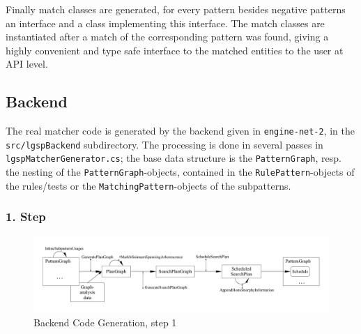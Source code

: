 Finally match classes are generated, for every pattern besides negative patterns an interface and a class implementing this interface.
The match classes are instantiated after a match of the corresponding pattern was found, giving a highly convenient and type safe interface to the matched entities to the user at API level.


\subsection{Backend}

The real matcher code is generated by the backend given in \texttt{engine-net-2}, in the \texttt{src/lgspBackend} subdirectory.
The processing is done in several passes in \texttt{lgsp\-Matcher\-Generator.cs}; the base data structure is the \texttt{PatternGraph}, resp. the nesting of the \texttt{PatternGraph}-objects, contained in the \texttt{RulePattern}-objects of the rules/tests or the \texttt{Matching\-Pattern}-objects of the subpatterns.

\pagebreak

\subsubsection*{1. Step}

\begin{figure}[htbp]
  \centering
  \includegraphics[width=\textwidth]{fig/AblaufCodeerzeugungBackend1}
  \caption{Backend Code Generation, step 1}
  \label{figbackendcodegen1}
\end{figure}

